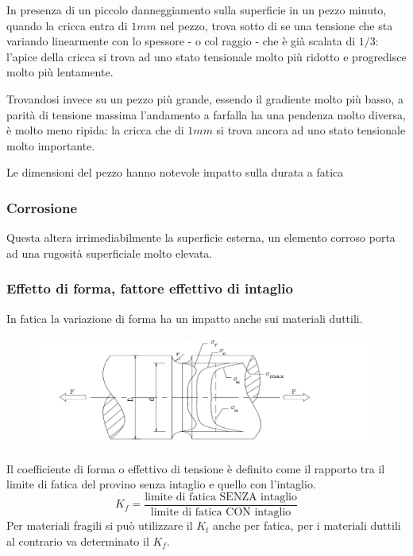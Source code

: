 			 In presenza di un piccolo danneggiamento sulla superficie in un pezzo minuto, quando la cricca entra di $ 1mm $ nel pezzo, trova sotto di se una tensione che sta variando linearmente con lo spessore - o col raggio - che è già scalata di $1/3$: l'apice della cricca si trova ad uno stato tensionale molto più ridotto e progredisce molto più lentamente.
			 
			 Trovandosi invece su un pezzo più grande, essendo il gradiente molto più basso, a parità di tensione massima l'andamento a farfalla ha una pendenza molto diversa, è molto meno ripida: la cricca che di $ 1mm $ si trova ancora ad uno stato tensionale molto importante.
			 
			 Le dimensioni del pezzo hanno notevole impatto sulla durata a fatica \newline
			 
\subsubsection{Corrosione} 
			 Questa altera irrimediabilmente la superficie esterna, un elemento corroso porta ad una rugosità superficiale molto elevata. 
			 
\subsubsection{	Effetto di forma, fattore effettivo di intaglio}
			 In fatica la variazione di forma ha un impatto anche sui materiali duttili.
			\begin{figure}[H]
				\centering
				\includegraphics[width=0.5\linewidth]{immagini_10/screenshot025}
				\label{fig:screenshot025}
			\end{figure}
			
			Il coefficiente di forma o effettivo di tensione è definito come il rapporto tra il limite di fatica del provino senza intaglio e quello con l'intaglio.
			\[K_f = \dfrac{\text{limite di fatica SENZA intaglio}}{\text{limite di fatica CON intaglio}}\]
			Per materiali fragili si può utilizzare il $K_t$ anche per fatica, per i materiali duttili al contrario va determinato il $K_f$.
			
